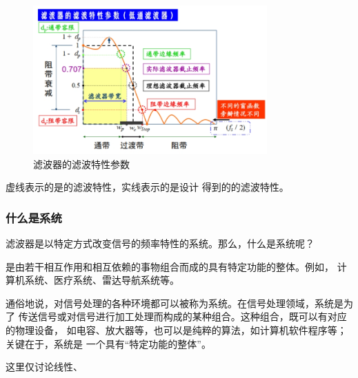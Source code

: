 \begin{example}[（低通）滤波器的滤波特性参数]
    \begin{figure}[H]
        \centering
        \includegraphics[width=0.8\textwidth]{chap4/img/filter_characteristics.png}
        \caption{滤波器的滤波特性参数}
        \label{fig:filter-characteristics}
    \end{figure}
    虚线表示的是的滤波特性，实线表示的是设计
    得到的的滤波特性。
\end{example}

\subsubsection{什么是系统}

滤波器是以特定方式改变信号的频率特性的系统。那么，什么是系统呢？

\begin{definition}[系统]
    是由若干相互作用和相互依赖的事物组合而成的具有特定功能的整体。例如，
    计算机系统、医疗系统、雷达导航系统等。

    通俗地说，对信号处理的各种环境都可以被称为系统。在信号处理领域，系统是为了
    传送信号或对信号进行加工处理而构成的某种组合。这种组合，既可以有对应的物理设备，
    如电容、放大器等，也可以是纯粹的算法，如计算机软件程序等；关键在于，系统是
    一个具有``特定功能的整体''。
\end{definition}

\begin{example}[系统的分类]
    
\end{example}

\begin{example}[常见的系统类型]
    这里仅讨论线性、
\end{example}

